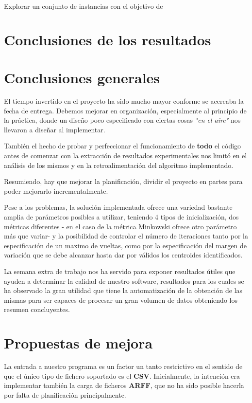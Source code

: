 \documentclass[a4paper]{report}
\begin{document}
	Explorar un conjunto de instancias con el objetivo de 
	
	\section{Conclusiones de los resultados}
	
	\section{Conclusiones generales}
	
	El tiempo invertido en el proyecto ha sido mucho mayor conforme se acercaba la fecha de entrega. Debemos mejorar en organización, especialmente al principio de la práctica, donde un diseño poco especificado con ciertas cosas \textit{"en el aire"} nos llevaron a diseñar al implementar.
	
	También el hecho de probar y perfeccionar el funcionamiento de \textbf{todo} el código antes de comenzar con la extracción de resultados experimentales nos limitó en el análisis de los mismos y en la retroalimentación del algoritmo implementado.
	
	Resumiendo, hay que mejorar la planificación, dividir el proyecto en partes para poder mejorarlo incrementalmente.
	
	Pese a los problemas, la solución implementada ofrece una variedad bastante amplia de parámetros posibles a utilizar, teniendo 4 tipos de inicialización, dos métricas diferentes - en el caso de la métrica Minkowski ofrece otro parámetro más que variar- y la posibilidad de controlar el número de iteraciones tanto por la especificación de un maximo de vueltas, como por la especificación del margen de variación que se debe alcanzar hasta dar por válidos los centroides identificados.
	
	La semana extra de trabajo nos ha servido para exponer resultados útiles que ayuden a determinar la calidad de nuestro software, resultados para los cuales se ha observado la gran utilidad que tiene la automatización de la obtención de las mismas para ser capaces de procesar un gran volumen de datos obteniendo los resumen concluyentes.
	
	\section{Propuestas de mejora}
	
	La entrada a nuestro programa es un factor un tanto restrictivo en el sentido de que el único tipo de fichero soportado es el \textbf{CSV}. Inicialmente, la intención era implementar también la carga de ficheros \textbf{ARFF}, que no ha sido posible hacerla por falta de planificación principalmente.
	
\end{document}
